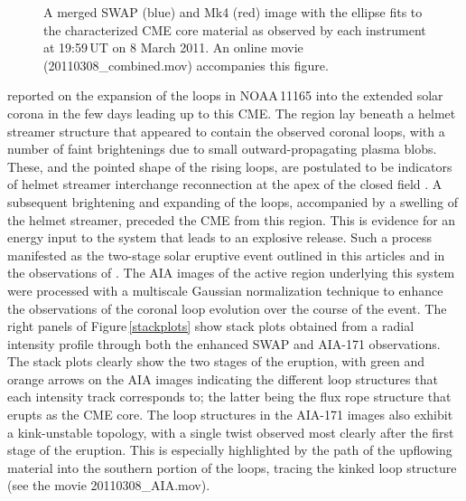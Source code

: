 \documentclass[namedreferences]{solarphysics}
\begin{document}
\begin{article}
\begin{figure}[t]
\caption{A merged SWAP (blue) and Mk4 (red) image with the ellipse fits to the characterized CME core material as observed by each instrument at 19:59\,UT on 8 March 2011. An online movie (20110308\_combined.mov) accompanies this figure.}
\label{combined}
\end{figure}

 reported on the expansion of the loops in NOAA\,11165 into the extended solar corona in the few days leading up to this CME. The region lay beneath a helmet streamer structure that appeared to contain the observed coronal loops, with a number of faint brightenings due to small outward-propagating plasma blobs. These, and the pointed shape of the rising loops, are postulated to be indicators of helmet streamer interchange reconnection at the apex of the closed field \cite{2012ApJ...749..182W}. A subsequent brightening and expanding of the loops, accompanied by a swelling of the helmet streamer, preceded the CME from this region. This is evidence for an energy input to the system that leads to an explosive release. Such a process manifested as the two-stage solar eruptive event outlined in this articles and in the observations of . The AIA images of the active region underlying this system were processed with a multiscale Gaussian normalization technique \cite{2014SoPh..289.2945M} to enhance the observations of the coronal loop evolution over the course of the event. The right panels of Figure\,\ref{stackplots} show stack plots obtained from a radial intensity profile through both the enhanced SWAP and AIA-171 observations. The stack plots clearly show the two stages of the eruption, with green and orange arrows on the AIA images indicating the different loop structures that each intensity track corresponds to; the latter being the flux rope structure that erupts as the CME core. The loop structures in the AIA-171 images also exhibit a kink-unstable topology, with a single twist observed most clearly after the first stage of the eruption. This is especially highlighted by the path of the upflowing material into the southern portion of the loops, tracing the kinked loop structure (see the movie 20110308\_AIA.mov).	 


\end{article}
\end{document}
